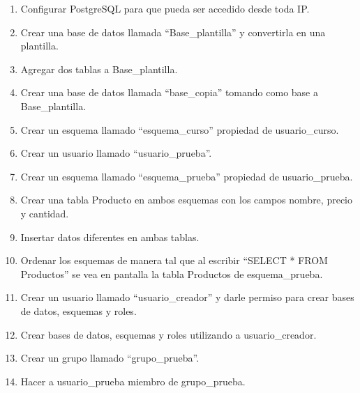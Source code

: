 \begin{enumerate}
\item Configurar PostgreSQL para que pueda ser accedido desde toda IP.
\item Crear una base de datos llamada ``Base\_plantilla'' y convertirla en una plantilla.
\item Agregar dos tablas a Base\_plantilla.
\item Crear una base de datos llamada ``base\_copia'' tomando como base a Base\_plantilla.
\item Crear un esquema llamado “esquema\_curso” propiedad de usuario\_curso.
\item Crear un usuario llamado “usuario\_prueba”.
\item Crear un esquema llamado “esquema\_prueba” propiedad de usuario\_prueba.
\item Crear una tabla Producto en ambos esquemas con los campos nombre, precio y cantidad.
\item Insertar datos diferentes en ambas tablas.
\item Ordenar los esquemas de manera tal que al escribir ``SELECT * FROM Productos'' se vea en pantalla la tabla Productos de esquema\_prueba.
\item Crear un usuario llamado ``usuario\_creador'' y darle permiso para crear bases de datos, esquemas y roles.
\item Crear bases de datos, esquemas y roles utilizando a usuario\_creador.
\item Crear un grupo llamado “grupo\_prueba”.
\item Hacer a usuario\_prueba miembro de grupo\_prueba.

\end{enumerate}